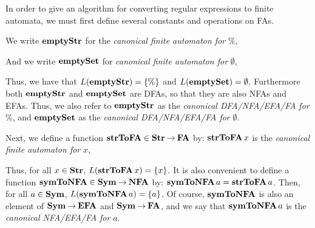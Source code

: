 %
%

In order to give an algorithm for converting regular expressions to
finite automata, we must first define several constants and operations
on FAs.

%
We write $\mathbf{emptyStr}$ for the \emph{canonical finite
automaton for} $\%$,
\begin{center}

\end{center}
%
And we write $\mathbf{emptySet}$ for \emph{canonical finite automaton for} $\emptyset$,
\begin{center}

\end{center}
Thus, we have that $L(\mathbf{emptyStr})=\{\%\}$ and $L(\mathbf{emptySet})=\emptyset$.
Furthermore both $\mathbf{emptyStr}$ and $\mathbf{emptySet}$ are DFAs, so that they
are also NFAs and EFAs.  Thus, we also refer to $\mathbf{emptyStr}$ as the
\emph{canonical DFA/NFA/EFA/FA for} $\%$, and $\mathbf{emptySet}$ as the
\emph{canonical DFA/NFA/EFA/FA for} $\emptyset$.

%
Next, we define a function $\mathbf{strToFA}\in\mathbf{Str}\mathbin{\to}\mathbf{FA}$ by:
$\mathbf{strToFA}\,x$ is the \emph{canonical finite automaton for} $x$,
\begin{center}

\end{center}
Thus, for all $x\in\mathbf{Str}$, $L(\mathbf{strToFA}\,x)=\{x\}$.
%
It is also convenient to define a function $\mathbf{symToNFA}\in\mathbf{Sym}\mathbin{\to}\mathbf{NFA}$
by: $\mathbf{symToNFA}\,a=\mathbf{strToFA}\,a$.  Then, for all $a\in\mathbf{Sym}$,
$L(\mathbf{symToNFA}\,a)=\{a\}$.  Of course, $\mathbf{symToNFA}$ is also an element of
$\mathbf{Sym}\mathbin{\to}\mathbf{EFA}$ and $\mathbf{Sym}\mathbin{\to}\mathbf{FA}$, and we say that $\mathbf{symToNFA}\,a$ is
the \emph{canonical NFA/EFA/FA for} $a$.


